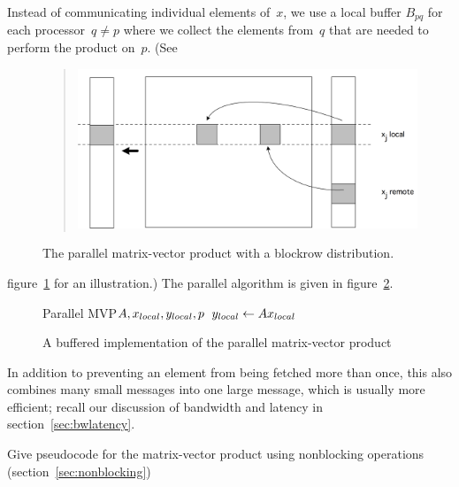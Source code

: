 Instead of communicating individual elements of~$x$, we use a local
buffer $B_{pq}$ for each processor~$q\not=p$ where we collect the
elements from~$q$ that are needed to perform the product on~$p$. (See
\begin{figure}
  \begin{quote}
    \includegraphics[scale=.12]{graphics/distmvp}
  \end{quote}
  \caption{The parallel matrix-vector product with a blockrow
    distribution.}
  \label{fig:distmvp2}
\end{figure}
figure~\ref{fig:distmvp2} for an illustration.) The parallel algorithm
is given in figure~\ref{fig:buffer-pmvp}.
\begin{figure}
\begin{displayprocedure}{Parallel MVP}{$A,x_{\mathrm\scriptstyle local},y_{\mathrm\scriptstyle local},p$}
  $y_{\mathrm\scriptstyle local}\leftarrow A x_{\mathrm\scriptstyle local}$\\
\end{displayprocedure}
  \caption{A buffered implementation of the parallel matrix-vector
    product}
  \label{fig:buffer-pmvp}
\end{figure}

In addition to preventing an element from being fetched more than
once, this also combines many small messages into one large message,
which is usually more efficient; recall our discussion of bandwidth
and latency in section~\ref{sec:bwlatency}.

\begin{exercise}
  Give pseudocode for the matrix-vector product using 
  nonblocking operations (section~\ref{sec:nonblocking})
\end{exercise}

